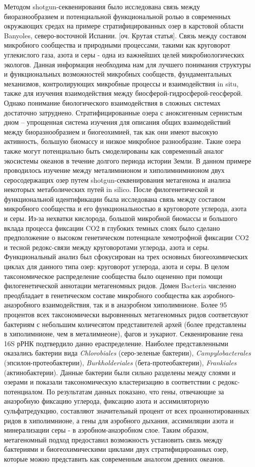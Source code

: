 Методом shotgun-секвенирования было исследована связь между биоразнообразием и потенциальной функциональной ролью в современных окружающих средах на примере стратифицированных озер  в карстовой области Banyoles, северо-восточной Испании. [оч. Крутая статья]. Связь между составом микробного сообщества и природными процессами, такими как круговорот углекислого газа, азота и серы  - одна из важнейших целей микробиологических экологов. Данная информация необходима нам для лучшего понимания структуры и функциональных возможностей микробных сообществ, фундаментальных механизмов, контролирующих микробные процессы и взаимодействия in situ, также для изучения взаимодействия между биосферой-гидросферой-геосферой. Однако понимание биологического взаимодействия в сложных системах достаточно затруднено.  Стратифицированные озера с аноксигенным сернистым дном – упрощенная система изучения для описания общих взаимодействий между биоразнообразием и биогеохимией, так как они имеют высокую активность, большую биомассу и низкое микробное разнообразие. Такие озера также могут потенциально быть смоделированы как современный аналог экосистемы океанов в течение долгого периода истории Земли. В данном примере проводилось изучение между металимнионом и хиполимнимнионом двух серосодержащих озер путем  shotgun-секвенирования метагенома и анализа некоторых метаболических путей in silico. После филогенетической и функциональной идентификации была исследована связь между составом микробного сообщества и его функциональностью в круговороте углерода, азота и серы. Из-за нехватки кислорода, большой микробной биомассы и большого вклада процесса фиксации CO2 в глубоких темных слоях было сделано предположение о высоком генетическом потенциале хемотрофной фиксации CO2 и тесной редокс-связи между круговоротами углерода, азота и серы. Функциональный анализ был сфокусирован на трех основных биогеохимических циклах для данного типа озер: круговорот углерода, азота и серы. В целом таксономическое распределение сообщества было оцененно при помощи филогенетической аннотации метагеномных ридов. Домен Bacteria численно преодбладает в генетическом составе микробного сообщества как аэробного-анаэробного взаимодействия, так и в анаэробном хиполимнионе. Более 95  процентов  всех таксономически выровненных метагеномных ридов соответсвуют бактериям с небольшим количесвтом представителей архей (более представлены в хиполимнионе, чем в металимнеоне), фагов и эукариот.  Секвенирование гена 16S рРНК подтвердило данно ераспределение. Наиболее представленными оказались бактерии вида \textit{Chlorobiales} (серо-зеленые бактерии), \textit{Campylobacterales} (эпсилон-протеобактерии), \textit{Burkholderiales} (бета-протеобактерии), \textit{Frankiales} (актинобактерии). Данные бактерии были сильно разделены между слоями и озерами и показали таксономическую кластеризацию в соответствии с редокс-потенциалом. По результатам данных показано, что гены, отвечающие за анаэробную фиксацию углерода, фиксацию азота и ассимиляторную сульфатредукцию, составляют значительный процент от всех проаннотированных ридов в хиполимнионе,  а гены для аэробного дыхания, ассимиляции азота и минерализации серы - в аэробном-анаэробном слое.  Таким образом, метагеномный подход предоставил возможность установить связь между бактериями и биогеохимическими циклами двух стратифицироанных озер, которые можно представить как современным аналогом древних океанов. 
